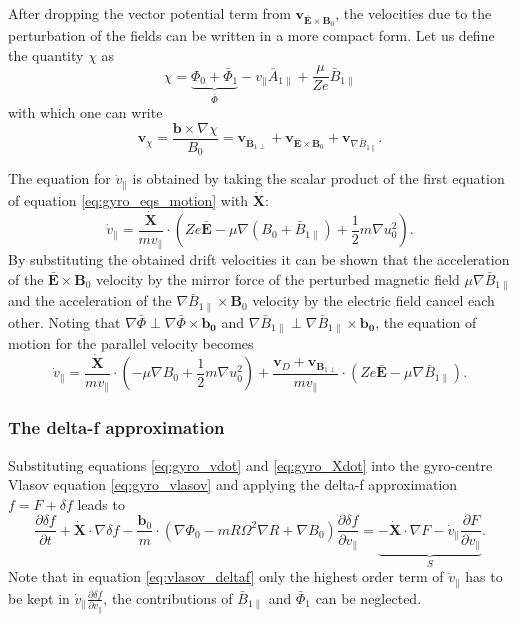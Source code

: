 \documentclass[a4paper,10pt]{article}
\renewcommand{\vec}[1]{\mathbf{#1}}
\begin{document}
After dropping the vector potential term from $\mathbf{v}_{\bar{\vec{E}} \times \vec{B}_0}$, the velocities due to the perturbation of the fields can be written in a more compact form. Let us define the quantity $\chi$ as
\[\chi = \underbrace{\Phi_0 + \bar{\Phi}_1}_{\bar{\Phi}} - v_{\parallel} \bar{A}_{1 \parallel} + \frac{\mu}{Z e} \bar{B}_{1 \parallel} \]
with which one can write
\[\mathbf{v}_{\chi} = \frac{\mathbf{b} \times \nabla \chi}{B_0} = \mathbf{v}_{\bar{\vec{B}}_{1\perp}} + \mathbf{v}_{\bar{\vec{E}} \times \vec{B}_0} + \mathbf{v}_{\nabla \bar{B}_{1 \parallel}}.\]

The equation for $\dot{v}_{\parallel}$ is obtained by taking the scalar product of the first equation of equation \ref{eq:gyro_eqs_motion} with $\dot{\mathbf{X}}$:
\begin{equation}
	\dot{v}_{\parallel} = \frac{\dot{\mathbf{X}}}{m v_{\parallel}} \cdot \left( Z e \bar{\mathbf{E}} - \mu \nabla (B_0 + \bar{B}_{1 \parallel}) + \frac{1}{2}m \nabla u_0^2 \right).
\label{eq:gyro_vdot}
\end{equation}
By substituting the obtained drift velocities it can be shown that the acceleration of the $\bar{\vec{E}} \times \vec{B}_0$ velocity by the mirror force of the perturbed magnetic field $\mu \nabla \bar{B}_{1 \parallel}$ and the acceleration of the $\nabla \bar{B}_{1 \parallel} \times \vec{B}_0$ velocity by the electric field cancel each other. Noting that $\nabla \bar{\Phi} \perp \nabla \bar{\Phi} \times \vec{b_0}$ and $\nabla \bar{B}_{1 \parallel} \perp \nabla \bar{B}_{1 \parallel} \times \vec{b_0}$, the equation of motion for the parallel velocity becomes
\begin{equation}
	\dot{v}_{\parallel} = \frac{\dot{\mathbf{X}}}{m v_{\parallel}} \cdot \left( - \mu \nabla B_0 + \frac{1}{2}m \nabla u_0^2 \right) + \frac{\vec{v}_{D} +  \vec{v}_{\vec{B}_{1 \perp}}}{m v_{\parallel}} \cdot (Z e \bar{\vec{E}} - \mu \nabla \bar{B}_{1 \parallel} ).
\end{equation}

\subsubsection{The delta-f approximation}
Substituting equations \ref{eq:gyro_vdot} and \ref{eq:gyro_Xdot} into the gyro-centre Vlasov equation \ref{eq:gyro_vlasov} and applying the delta-f approximation $f = F + \delta f$ leads to
\begin{equation}
	\frac{\partial \delta f}{\partial t} + \dot{\mathbf{X}} \cdot \nabla \delta f - \frac{\vec{b}_0}{m} \cdot ( \nabla \Phi_0 - m R \Omega^2 \nabla R + \nabla B_0 ) \frac{\partial \delta f}{\partial v_{\parallel}} = \underbrace{- \dot{\mathbf{X}} \cdot \nabla F - \dot{v}_\parallel \frac{\partial F}{\partial v_{\parallel}}}_{S}.
	\label{eq:vlasov_deltaf}
\end{equation}
Note that in equation \ref{eq:vlasov_deltaf} only the highest order term of $\dot{v}_{\parallel}$ has to be kept in $\dot{v}_{\parallel} \frac{\partial \delta f}{\partial v_{\parallel}}$, the contributions of $\bar{B}_{1 \parallel}$ and $\bar{\Phi}_1$ can be neglected. 
\end{document}

